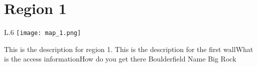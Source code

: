 \onecolumn
\chapter*{Region 1}
\begin{wrapfigure}{L}{.6\textwidth}
\texttt{[image: map\_1.png]}
\end{wrapfigure}
This is the description for region 1.
  {This is the description for the first wall}{}{What is the access information}{How do you get there}{}{
  }
\boulderfield
  {Boulderfield Name}
  {}
  {
  }
  {
    \boulder
      {Big Rock}
      {}
      {
      }
      {
      }
  }
